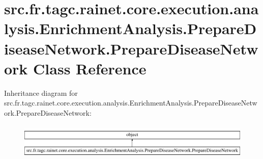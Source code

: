 \hypertarget{classsrc_1_1fr_1_1tagc_1_1rainet_1_1core_1_1execution_1_1analysis_1_1EnrichmentAnalysis_1_1Prepadc28f54f950771e5293b3cf9082b7c77}{\section{src.\-fr.\-tagc.\-rainet.\-core.\-execution.\-analysis.\-Enrichment\-Analysis.\-Prepare\-Disease\-Network.\-Prepare\-Disease\-Network Class Reference}
\label{classsrc_1_1fr_1_1tagc_1_1rainet_1_1core_1_1execution_1_1analysis_1_1EnrichmentAnalysis_1_1Prepadc28f54f950771e5293b3cf9082b7c77}
}
Inheritance diagram for src.\-fr.\-tagc.\-rainet.\-core.\-execution.\-analysis.\-Enrichment\-Analysis.\-Prepare\-Disease\-Network.\-Prepare\-Disease\-Network\-:\begin{figure}[H]
\begin{center}
\leavevmode
\includegraphics[height=1.723077cm]{classsrc_1_1fr_1_1tagc_1_1rainet_1_1core_1_1execution_1_1analysis_1_1EnrichmentAnalysis_1_1Prepadc28f54f950771e5293b3cf9082b7c77}
\end{center}
\end{figure}
